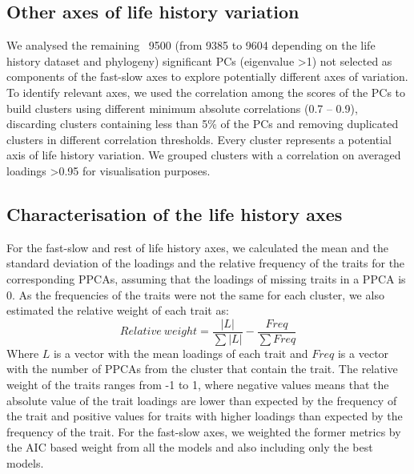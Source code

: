 \subsection*{Other axes of life history variation}

We analysed the remaining ~9500 (from 9385 to 9604 depending on the life 
history dataset and phylogeny) significant PCs (eigenvalue \textgreater{1}) not 
selected as components of the fast-slow axes to explore potentially different
axes of variation. To identify relevant axes, we used the correlation among the
scores of the PCs to build clusters using different minimum absolute
correlations (0.7 – 0.9), discarding clusters containing less than 5\% of the
PCs and removing duplicated clusters in different correlation thresholds.
Every cluster represents a potential axis of life history variation. We grouped 
clusters with a correlation on averaged loadings \textgreater{0.95} for 
visualisation purposes.


\subsection*{Characterisation of the life history axes}

For the fast-slow and rest of life history axes, we calculated the mean and the
standard deviation of the loadings and the relative frequency of the traits for
the corresponding PPCAs, assuming that the loadings of missing traits in a PPCA
is 0. As the frequencies of the traits were not the same for each cluster, we
also estimated the relative weight of each trait as:
$$ Relative~weight = \frac{ \left \lvert L \right \rvert } { \sum{\left \lvert L \right \rvert} } - \frac{ Freq } { \sum{Freq} } $$
%
%
%
%
Where $L$ is a vector with the mean loadings of each trait and $Freq$ is a
vector with the number of PPCAs from the cluster that contain the trait. The
relative weight of the traits ranges from -1 to 1, where negative values means
that the absolute value of the trait loadings are lower than expected by the
frequency of the trait and positive values for traits with higher loadings than
expected by the frequency of the trait. For the fast-slow axes, we weighted the
former metrics by the AIC based weight from all the models and also including
only the best models.

